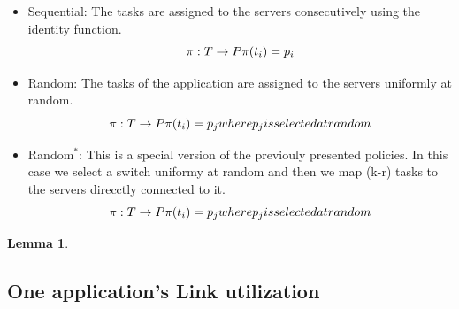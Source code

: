 \documentclass{sig-alternate}
\newtheorem{lemma}{Lemma}
\begin{document}
\begin{itemize}
    \item Sequential: The tasks are assigned to the servers consecutively using the identity function.
        \begin{equation}
            \pi:T \rightarrow P\\
            \pi(t_i)=p_i
        \end{equation}
    \item Random: The tasks of the application are assigned to the servers uniformly at random.
        \begin{equation}
            \pi:T \rightarrow P\\
            \pi(t_i)=p_j where p_j is selected at random
        \end{equation}
    \item Random$^*$: This is a special version of the previouly presented policies. In this case we select a switch uniformy at random and then we map (k-r) tasks to the servers direcctly connected to it. 
        \begin{equation}
            \pi:T \rightarrow P\\
            \pi(t_i)=p_j where p_j is selected at random
        \end{equation}
\end{itemize}

\begin{lemma}

\end{lemma}



%         


\subsection{One application's Link utilization}
\label{linkutilization1app}
\end{document}
